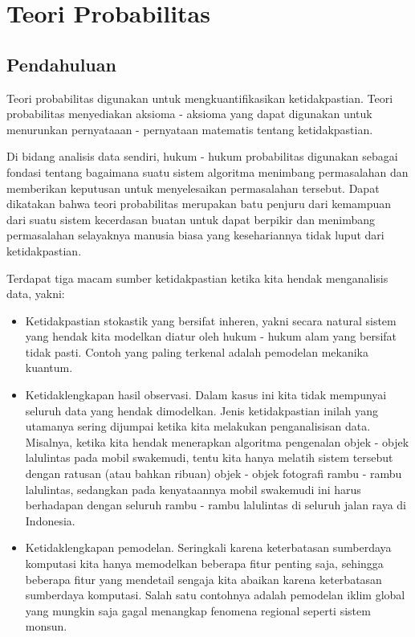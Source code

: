 \chapter{Teori Probabilitas}
\section{Pendahuluan}
Teori probabilitas digunakan untuk mengkuantifikasikan ketidakpastian. Teori probabilitas menyediakan aksioma - aksioma yang dapat digunakan untuk menurunkan pernyataaan - pernyataan matematis tentang ketidakpastian.

Di bidang analisis data sendiri, hukum - hukum probabilitas digunakan sebagai fondasi tentang bagaimana suatu sistem algoritma menimbang permasalahan dan memberikan keputusan untuk menyelesaikan permasalahan tersebut. Dapat dikatakan bahwa teori probabilitas merupakan batu penjuru dari kemampuan dari suatu sistem kecerdasan buatan untuk dapat berpikir dan menimbang permasalahan selayaknya manusia biasa yang kesehariannya tidak luput dari ketidakpastian.

Terdapat tiga macam sumber ketidakpastian ketika kita hendak menganalisis data, yakni:
\begin{itemize}
	\item Ketidakpastian stokastik yang bersifat inheren, yakni secara natural sistem yang hendak kita modelkan diatur oleh hukum - hukum alam yang bersifat tidak pasti. Contoh yang paling terkenal adalah pemodelan mekanika kuantum.
	\item Ketidaklengkapan hasil observasi. Dalam kasus ini kita tidak mempunyai seluruh data yang hendak dimodelkan. Jenis ketidakpastian inilah yang utamanya sering dijumpai ketika kita melakukan penganalisisan data. Misalnya, ketika kita hendak menerapkan algoritma pengenalan objek - objek lalulintas pada mobil swakemudi, tentu kita hanya melatih sistem tersebut dengan ratusan (atau bahkan ribuan) objek - objek fotografi rambu - rambu lalulintas, sedangkan pada kenyataannya mobil swakemudi ini harus berhadapan dengan seluruh rambu - rambu lalulintas di seluruh jalan raya di Indonesia.
	\item Ketidaklengkapan pemodelan. Seringkali karena keterbatasan sumberdaya komputasi kita hanya memodelkan beberapa fitur penting saja, sehingga beberapa fitur yang mendetail sengaja kita abaikan karena keterbatasan sumberdaya komputasi. Salah satu contohnya adalah pemodelan iklim global yang mungkin saja gagal menangkap fenomena regional seperti sistem monsun.
\end{itemize} 

